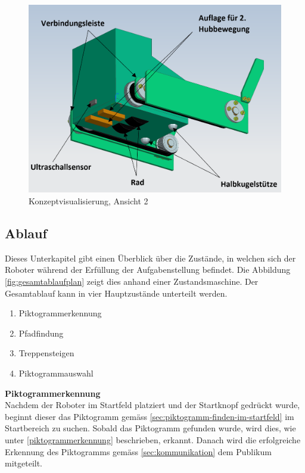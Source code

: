 \begin{figure}[H]
  \includegraphics[width=1\textwidth]{img/Treppensteigen/Geraetansicht2_final.PNG}
  \centering
  \caption{Konzeptvisualisierung, Ansicht 2}
  \label{fig:konzeptvisualisierung-ansicht2}
\end{figure}

\newpage

\subsection{Ablauf}
Dieses Unterkapitel gibt einen Überblick über die Zustände, in welchen sich der Roboter während der Erfüllung der Aufgabenstellung befindet. Die Abbildung \ref{fig:gesamtablaufplan} zeigt dies anhand einer Zustandsmaschine. Der Gesamtablauf kann in vier Hauptzustände unterteilt werden. 
\begin{enumerate}
    \item Piktogrammerkennung
    \item Pfadfindung
    \item Treppensteigen
    \item Piktogrammauswahl
\end{enumerate}

\textbf{Piktogrammerkennung}\\
Nachdem der Roboter im Startfeld platziert und der Startknopf gedrückt wurde, beginnt dieser das Piktogramm gemäss \ref{sec:piktogramm-finden-im-startfeld} im Startbereich zu suchen. Sobald das Piktogramm gefunden wurde, wird dies, wie unter \ref{piktogrammerkennung} beschrieben, erkannt. Danach wird die erfolgreiche Erkennung des Piktogramms gemäss \ref{sec:kommunikation} dem Publikum mitgeteilt. 

